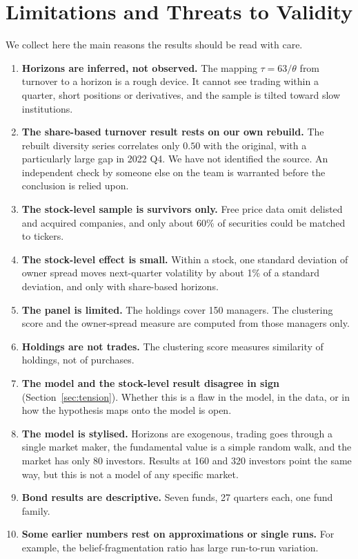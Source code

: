 \section{Limitations and Threats to Validity}
\label{sec:limits}

We collect here the main reasons the results should be read with care.

\begin{enumerate}[leftmargin=*]
\item \textbf{Horizons are inferred, not observed.} The mapping $\tau=63/\theta$ from turnover to a horizon is a rough device. It cannot see trading within a quarter, short positions or derivatives, and the sample is tilted toward slow institutions.
\item \textbf{The share-based turnover result rests on our own rebuild.} The rebuilt diversity series correlates only $0.50$ with the original, with a particularly large gap in 2022 Q4. We have not identified the source. An independent check by someone else on the team is warranted before the conclusion is relied upon.
\item \textbf{The stock-level sample is survivors only.} Free price data omit delisted and acquired companies, and only about 60\% of securities could be matched to tickers.
\item \textbf{The stock-level effect is small.} Within a stock, one standard deviation of owner spread moves next-quarter volatility by about 1\% of a standard deviation, and only with share-based horizons.
\item \textbf{The panel is limited.} The holdings cover 150 managers. The clustering score and the owner-spread measure are computed from those managers only.
\item \textbf{Holdings are not trades.} The clustering score measures similarity of holdings, not of purchases.
\item \textbf{The model and the stock-level result disagree in sign} (Section~\ref{sec:tension}). Whether this is a flaw in the model, in the data, or in how the hypothesis maps onto the model is open.
\item \textbf{The model is stylised.} Horizons are exogenous, trading goes through a single market maker, the fundamental value is a simple random walk, and the market has only 80 investors. Results at 160 and 320 investors point the same way, but this is not a model of any specific market.
\item \textbf{Bond results are descriptive.} Seven funds, 27 quarters each, one fund family.
\item \textbf{Some earlier numbers rest on approximations or single runs.} For example, the belief-fragmentation ratio has large run-to-run variation.
\end{enumerate}

